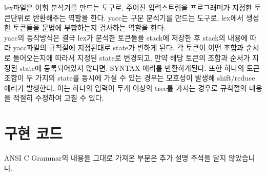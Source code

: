 \documentclass[11pt,oneside,a4paper]{article}
\begin{document}
lex파일은 어휘 분석기를 만드는 도구로, 주어진 입력스트림을 프로그래머가 지정한 토큰단위로 반환해주는 역할을 한다.
yacc는 구문 분석기를 만드는 도구로, lex에서 생성한 토큰들을 문법에 부합하는지 검사하는 역할을 한다.\\

yacc의 동작방식은 결국 lex가 분석한 토큰들을 stack에 저장한 후 stack의 내용에 따라 yacc파일의 규칙절에 지정된대로 state가 변하게 된다.
각 토큰이 어떤 조합과 순서로 들어오는지에 따라서 지정된 state로 변경되고, 만약 해당 토큰의 조합과 순서가 지정된 state에 등록되어있지 않다면, 
SYNTAX 에러를 반환하게된다. 또한 하나의 토큰 조합이 두 가지의 state를 동시에 가실 수 있는 경우는 모호성이 발생해 shift/reduce 에러가 발생한다.
이는 하나의 입력이 두개 이상의 tree를 가지는 경우로 규칙절의 내용을 적절히 수정하여 고칠 수 있다.\\
 
\section{구현 코드}
ANSI C Grammar의 내용을 그대로 가져온 부분은 추가 설명 주석을 달지 않았습니다.
\end{document}
